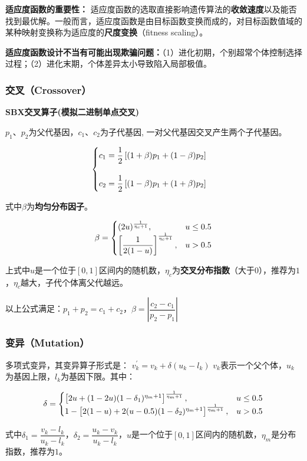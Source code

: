 \documentclass[UTF8]{ctexart}
\begin{document}
\textbf{适应度函数的重要性：} 适应度函数的选取直接影响遗传算法的\textbf{收敛速度}以及能否找到最优解。一般而言，适应度函数是由目标函数变换而成的，对目标函数值域的某种映射变换称为适应度的\textbf{尺度变换}（fitness scaling）。

\textbf{适应度函数设计不当有可能出现欺骗问题：}（1）进化初期，个别超常个体控制选择过程；（2）进化末期，个体差异太小导致陷入局部极值。

\subsubsection{交叉（Crossover）}
\textbf{SBX交叉算子(模拟二进制单点交叉)}

$p_1、p_2$为父代基因，$c_1、c_2$为子代基因, 一对父代基因交叉产生两个子代基因。

$$
\begin{cases}
c_1=\dfrac{1}{2}\left[(1+\beta)p_1+(1-\beta)p_2 \right]
\cr \cr
c_2=\dfrac{1}{2}\left[(1-\beta)p_1+(1+\beta)p_2 \right]
\end{cases}
$$

\noindent 式中$\beta$为\textbf{均匀分布因子}。

$$
\beta=\begin{cases}
(2u)^{\frac{1}{\eta_c+1}}, &u\leq 0.5
\cr \left[\dfrac{1}{2(1-u)}\right]^{\frac{1}{\eta_c+1}}, &u > 0.5
\end{cases}
$$

\noindent 上式中$u$是一个位于$[0,1]$区间内的随机数，$\eta_c$为\textbf{交叉分布指数}（大于$0$），推荐为$1$，$\eta_c$越大，子代个体离父代越远。

以上公式满足：$p_1+p_2=c_1+c_2$，$\beta=\left|\dfrac{c_2-c_1}{p_2-p_1}\right|$

\subsubsection{变异（Mutation）}

多项式变异，其变异算子形式是：
$v_{k}^{\prime}=v_{k}+\delta(u_{k}-l_{k})$
$v_k$表示一个父个体，$u_k$为基因上限，$l_k$为基因下限。其中：

$$
\delta=\begin{cases}
\left[2u+(1-2u)(1-\delta_1)^{\eta_m+1}\right]^{\frac{1}{\eta_m+1}}, &u\leq 0.5
\cr 
1-\left[2(1-u)+2(u-0.5)(1-\delta_2)^{\eta_m+1}\right]^{\frac{1}{\eta_m+1}}, &u > 0.5
\end{cases}
$$

\noindent 式中$\delta_1=\dfrac{v_k-l_k}{u_k-l_k}$，$\delta_2=\dfrac{u_k-v_k}{u_k-l_k}$，$u$是一个位于$[0,1]$区间内的随机数，$\eta_m$是分布指数，推荐为$1$。
\end{document}
